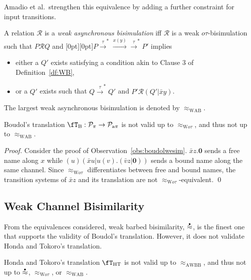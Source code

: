 \documentclass[runningheads]{llncs}
\newcommand{\df}[1]{Definition~\ref{df:#1}}
\newcommand{\obs}[1]{Observation~\ref{obs:#1}}
\newcommand{\T}{\mathcal{P}}             %
\newcommand{\bbT}{\T}
\newcommand{\plat}[1]{\raisebox{0pt}[0pt][0pt]{#1}}     %
\newcommand{\wbb}{\stackrel{\raisebox{-1pt}[0pt][0pt]{$\scriptscriptstyle \bullet$}}{\approx}}
\newcommand{\wbbisim}{\ensuremath{\mathrel{\approx_{\mathrm{AWBB}}}}}
\newcommand{\wotau}{\ensuremath{\mathrel{\approx_{\mathrm{W}o\tau}}}}
\newcommand{\wab}{\ensuremath{\mathrel{\approx_{\mathrm{WAB}}}}}
\newcommand{\mrel}{\ensuremath{\mathrel{\mathcal{R}}}}
\newcommand{\pims}{\pi}
\newcommand{\pima}{{\rm a\pi}}
\newcommand{\sI}{\fT}
\begin{document}
\noindent
Amadio et al.\ strengthen this equivalence by adding a further constraint
for input transitions.

\begin{definition}\rm
A relation {\mrel} is a {\em weak asynchronous bisimulation}\vspace{1pt} iff {\mrel} is a
weak $o\tau$-bisimulation such that \mbox{$P\mrel Q$} and
\plat{$P \stackrel{\tau}{\longrightarrow}^* \stackrel{x(y)}{\longrightarrow}
\stackrel{\tau}{\longrightarrow}^* P'$} implies
\begin{itemize}
\item either a $Q'$ exists satisfying a condition akin to Clause 3 of
 \df{WB},
\item or a $Q'$ exists such that $Q \stackrel{\tau}{\longrightarrow}^* Q'$ and
$P'\mrel (Q'|\bar{x}y)$.
\end{itemize}
The largest weak asynchronous bisimulation is denoted by $\wab$.
\end{definition}

\begin{observation}\rm
Boudol's translation ${\fT_{\rm B}} : \bbT_{\pims} \rightarrow \bbT_{\pima}$ is
not valid up to $\wotau$, and thus not up to $\wab$.
\end{observation}

\begin{proof}
Consider the proof of \obs{boudolwesim}.
$\bar{x}z.\bm{0}$ sends a free name along $x$ while $(u)(\bar{x}u|u(v).(\bar{v}z|\bm{0}))$ sends a bound name along the same channel.
Since $\wotau$ differentiates between free and bound names, the transition systems of $\bar{x}z$ and its translation are not $\wotau$-equivalent.
\qed
\end{proof}


\subsection{Weak Channel Bisimilarity}
\renewcommand{\sI}{\fT_{\rm HT}}

From the equivalences considered, weak barbed bisimilarity, $\wbb$, is the finest one that supports
the validity of Boudol's translation. However, it does not validate Honda and Tokoro's translation.

\begin{observation}\rm
Honda and Tokoro's translation $\sI$ is not valid up to $\wbbisim$, and thus not up to $\wbb$,
$\wotau$, or $\wab$.
\end{observation}
\end{document}
